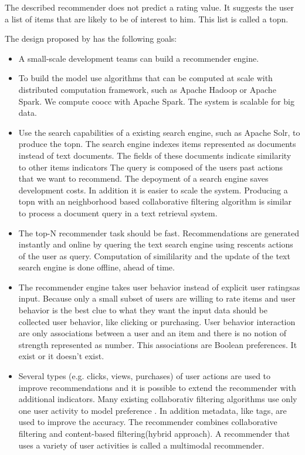 The described recommender does not predict a rating value. It suggests the user a list of items that are likely to be of interest to him. This list is called a \gls{topn}.

The design proposed by \cite{Dunning14} has the following goals:
\begin{itemize}
\item A small-scale development teams can build a recommender engine.
\item To build the model use algorithms that can be computed at scale with distributed computation framework, such as Apache Hadoop or Apache Spark. We compute \gls{coocc} with Apache Spark. The system is \gls{scalable} for big data.
\item Use the search capabilities of a existing search engine, such as Apache Solr, to produce the \gls{topn}. The search engine indexes items represented as documents instead of text documents. The fields of these documents indicate similarity to other items indicators The query is composed of the users past actions that we want to recommend. The depoyment of a search engine saves development costs. In addition it is easier to scale the system. Producing a \gls{topn} with an neighborhood based collaborative filtering algorithm is similar to process a document query in a text retrieval system. 
\item The top-N recommender task should be fast. Recommendations are generated instantly and online by quering the text search engine using rescents actions of the user as query. Computation of simililarity and the update of the text search engine is done offline, ahead of time.
\item The recommender engine takes user behavior instead of explicit user ratingsas input. Because only a small subset of users are willing to rate items and user behavior is the best clue to what they want the input data should be collected user behavior, like clicking or purchasing. User behavior interaction are only associations between a user and an item and there is no notion of strength represented as number. This associations are Boolean preferences. It exist or it doesn't exist. 
\item Several types (e.g. clicks, views, purchases) of user actions are used to improve recommendations and it is possible to extend the recommender with additional \glspl{indicator}. Many existing collaborativ filtering algorithms use only one user activity to model preference \cite{ferrel}. In addition metadata, like tags, are used to improve the accuracy. The recommender combines collaborative filtering and content-based filtering(hybrid approach). A recommender that uses a variety of user activities is called a \gls{multimodal} recommender. 
\end{itemize}

